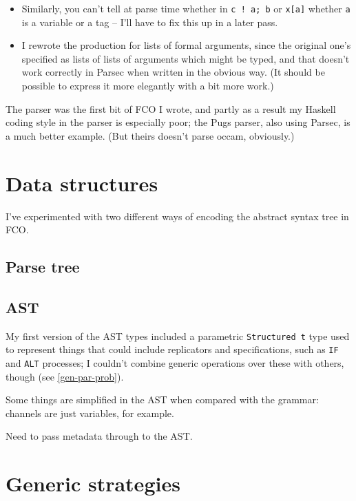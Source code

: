 \documentclass[a4paper,12pt]{article}
\def\occam{{\sffamily occam}\xspace}
\begin{document}
\begin{itemize}
\item Similarly, you can't tell at parse time whether in \verb|c ! a; b|
or \verb|x[a]| whether \verb|a| is a variable or a tag -- I'll have to
fix this up in a later pass.

\item I rewrote the production for lists of formal arguments, since the
original one's specified as lists of lists of arguments which might be
typed, and that doesn't work correctly in Parsec when written in the
obvious way. (It should be possible to express it more elegantly with a
bit more work.)

\end{itemize}

The parser was the first bit of FCO I wrote, and partly as a result my
Haskell coding style in the parser is especially poor; the Pugs parser,
also using Parsec, is a much better example. (But theirs doesn't parse
\occam, obviously.)

\section{Data structures}

I've experimented with two different ways of encoding the abstract
syntax tree in FCO.

\subsection{Parse tree}

\subsection{AST}

My first version of the AST types included a parametric
\verb|Structured t| type used to represent things that could include
replicators and specifications, such as \verb|IF| and \verb|ALT|
processes; I couldn't combine generic operations over these with others,
though (see \ref{gen-par-prob}).

Some things are simplified in the AST when compared with the grammar:
channels are just variables, for example.

Need to pass metadata through to the AST.

\section{Generic strategies}
\end{document}
